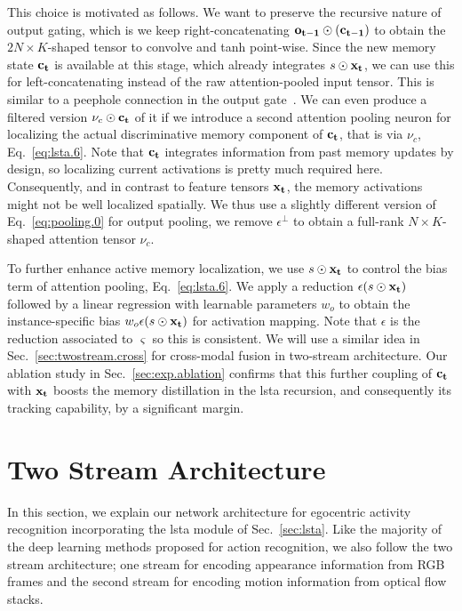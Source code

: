 \documentclass[10pt,twocolumn,letterpaper]{article}
\let\tanh\relax
\DeclareMathOperator\tanh{\eta}
\newcommand{\io}[1]{{\bf #1}}
\begin{document}
This choice is motivated as follows. We want to preserve the recursive nature of output gating, which is we keep right-concatenating $\io{o_{t-1}} \odot \tanh(\io{c_{t-1}})$ to obtain the $2N \times K$-shaped tensor to convolve and tanh point-wise. Since the new memory state $\io{c_t}$ is available at this stage, which already integrates $s \odot \io{x_t}$, we can use this for left-concatenating instead of the raw attention-pooled input tensor. This is similar to a peephole connection in the output gate~\cite{gers2000recurrent}. We can even produce a filtered version $\nu_c \odot \io{c_t}$ of it if we introduce a second attention pooling neuron for localizing the actual discriminative memory component of $\io{c_t}$, that is via $\nu_c$, Eq.~\ref{eq:lsta.6}. Note that $\io{c_t}$ integrates information from past memory updates by design, so localizing current activations is pretty much required here. Consequently, and in contrast to feature tensors $\io{x_t}$, the memory activations might not be well localized spatially. We thus use a slightly different version of Eq.~\ref{eq:pooling.0} for output pooling, we remove $\epsilon^{\perp}$ to obtain a full-rank $N \times K$-shaped attention tensor $\nu_c$. 

To further enhance active memory localization, we use $s \odot \io{x_t}$ to control the bias term of attention pooling, Eq.~\ref{eq:lsta.6}. We apply a reduction $\epsilon(s \odot \io{x_t})$ followed by a linear regression with learnable parameters $w_o$ to obtain the instance-specific bias $w_o \epsilon(s \odot \io{x_t})$ for activation mapping. Note that $\epsilon$ is the reduction associated to $\varsigma$ so this is consistent. We will use a similar idea in Sec.~\ref{sec:twostream.cross} for cross-modal fusion in two-stream architecture. Our ablation study in Sec.~\ref{sec:exp.ablation} confirms that this further coupling of $\io{c_t}$ with $\io{x_t}$ boosts the memory distillation in the \ac{lsta} recursion, and consequently its tracking capability, by a significant margin.


 
\section{Two Stream Architecture}
\label{sec:architecture}



In this section, we explain our network architecture for egocentric activity recognition incorporating the \ac{lsta} module of Sec.~\ref{sec:lsta}. Like the majority of the deep learning methods proposed for action recognition, we also follow the two stream architecture; one stream for encoding appearance information from RGB frames and the second stream for encoding motion information from optical flow stacks. 
\end{document}
